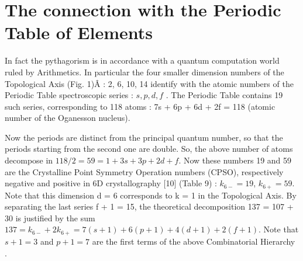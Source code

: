\documentclass[a4paper,9pt]{article}
\begin{document}


\section{The connection with the Periodic Table of Elements}

     In fact the pythagorism is in accordance with a quantum computation world ruled by Arithmetics. In particular the four smaller dimension numbers of the Topological Axis (Fig. 1)Â : 2, 6, 10, 14 identify with the atomic numbers of the Periodic Table spectroscopic series : $s, p, d, f$ . The Periodic Table contains 19 such series, corresponding to 118 atoms : 7s + 6p + 6d + 2f = 118 (atomic number of the Oganesson nucleus). 

     Now the periods are distinct from the principal quantum number, so that the periods starting from the second one are double. So, the above number of atoms decompose in $118/2 = 59 = 1 + 3s + 3p + 2d + f$. Now these numbers 19 and 59 are the Crystalline Point Symmetry Operation numbers (CPSO), respectively negative and positive in 6D crystallography [10] (Table 9) : $k_{6-} = 19$, $k_{6+} = 59$. Note that this dimension d = 6 corresponds to k = 1 in the Topological Axis. By separating the last series f + 1 = 15, the theoretical decomposition 137 = 107 + 30 is justified by the sum $137 =  k_{6-} + 2k_{6+} = 7(s +1) + 6(p +1) + 4(d +1) + 2(f +1)$. Note that $s + 1 = 3$ and $p + 1 = 7$ are the first terms of the above Combinatorial Hierarchy\cite{Bastin} .
\end{document}
